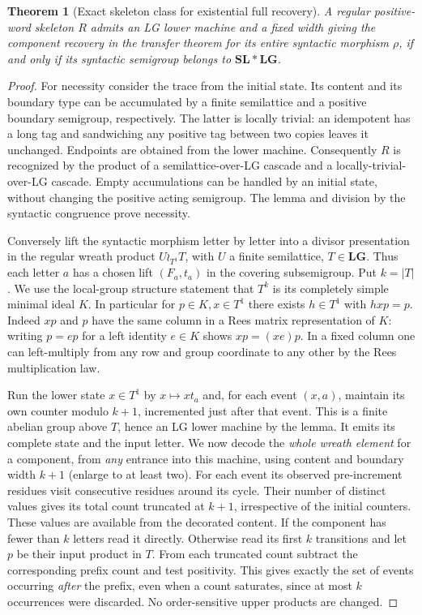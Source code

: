 \documentclass[11pt]{article}
\newtheorem{rdtheorem}{Theorem}
\newcommand{\rdSL}{\mathbf{SL}}
\newcommand{\rdLG}{\mathbf{LG}}
\begin{document}
\begin{rdtheorem}[Exact skeleton class for existential full recovery]
A regular positive-word skeleton $R$ admits an LG lower machine and a
fixed width giving the component recovery in the transfer theorem for
its entire syntactic morphism $\rho$, if and only if its syntactic
semigroup belongs to $\rdSL*\rdLG$.
\end{rdtheorem}
\begin{proof}
For necessity consider the trace from the initial state. Its content
and its boundary type can be accumulated by a finite semilattice and
a positive boundary semigroup, respectively. The latter is locally trivial:
an idempotent has a long tag and sandwiching any positive tag between two
copies leaves it unchanged. Endpoints are obtained from the lower machine.
Consequently $R$ is recognized by the product of a semilattice-over-LG
cascade and a locally-trivial-over-LG cascade. Empty accumulations can be
handled by an initial state, without changing the positive acting semigroup.
The lemma and division by the syntactic congruence prove necessity.

Conversely lift the syntactic morphism letter by letter into a divisor
presentation in the regular wreath product $U\wr_{T^1}T$, with $U$ a
finite semilattice, $T\in\rdLG$. Thus each letter $a$ has a chosen lift
$(F_a,t_a)$ in the covering subsemigroup. Put $k=|T|$. We use the
local-group structure statement that $T^k$ is its completely simple
minimal ideal $K$. In particular for $p\in K,x\in T^1$ there exists
$h\in T^1$ with $hxp=p$. Indeed $xp$ and $p$ have the same column in a
Rees matrix representation of $K$: writing $p=e p$ for a left identity
$e\in K$ shows $xp=(xe)p$. In a fixed column one can left-multiply from
any row and group coordinate to any other by the Rees multiplication law.

Run the lower state $x\in T^1$ by $x\mapsto xt_a$ and, for each event
$(x,a)$, maintain its own counter modulo $k+1$, incremented just after that
event. This is a finite abelian group above $T$, hence an LG lower machine
by the lemma. It emits its complete state and the input letter.
We now decode the \emph{whole wreath element} for a component, from
\emph{any} entrance into this machine, using content and boundary width
$k+1$ (enlarge to at least two). For each event its observed pre-increment
residues visit consecutive residues around its cycle. Their number of
distinct values gives its total count truncated at $k+1$, irrespective of
the initial counters. These values are available from the decorated content.
If the component has fewer than $k$ letters read it directly.
Otherwise read its first $k$ transitions and let $p$ be their input product
in $T$. From each truncated count subtract the corresponding prefix count
and test positivity. This gives exactly the set of events occurring
\emph{after} the prefix, even when a count saturates, since at most $k$
occurrences were discarded. No order-sensitive upper products are changed.


\end{proof}
\end{document}

